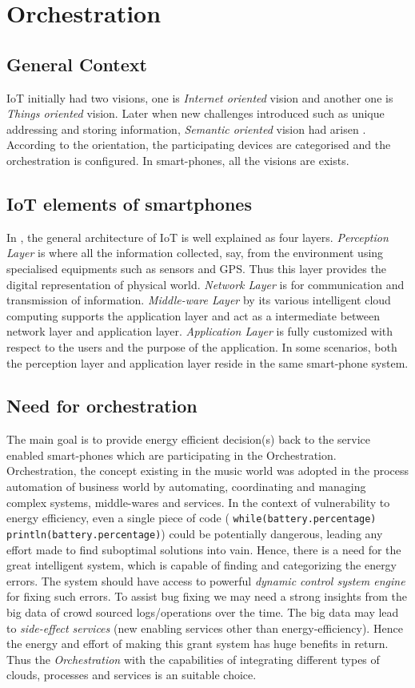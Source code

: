 \chapter{Orchestration}

\section{General Context}
IoT initially had two visions, one is \textit{Internet oriented} vision and another one is \textit{Things oriented} vision. Later when new challenges introduced such as unique addressing and storing information, \emph{Semantic oriented} vision had arisen \cite{IoT:Survey}. According to the orientation, the participating devices are categorised and the orchestration is configured. In smart-phones, all the visions are exists. 
\section{IoT elements of smartphones}
In \cite{IoT:Arch}, the general architecture of IoT is well explained as four layers. \emph{Perception Layer} is where all the information collected, say, from the environment using specialised equipments such as sensors and GPS. Thus this layer provides the digital representation of physical world. \emph{Network Layer} is for communication and transmission of information. \emph{Middle-ware Layer} by its various intelligent cloud computing supports the application layer and act as a intermediate between network layer and application layer. \emph{Application Layer} is fully customized with respect to the users and the purpose of the application. In some scenarios, both the perception layer and application layer reside in the same smart-phone system.
\section{Need for orchestration}
The main goal is to provide energy efficient decision(s) back to the service enabled smart-phones which are participating in the Orchestration. Orchestration, the concept existing in the music world was adopted in the process automation of business world by automating, coordinating and managing complex systems, middle-wares and services. In the context of vulnerability to energy efficiency, even a single piece of code  ( {\tt while(battery.percentage) println(battery.percentage)}) could be potentially dangerous, leading any effort made to find suboptimal solutions into vain. Hence, there is a need for the great intelligent system, which is capable of finding and categorizing the energy errors. The system should have access to powerful \textit{dynamic control system engine} for fixing such errors. To assist bug fixing we may need a strong insights from the big data of crowd sourced logs/operations  over the time. The big data may lead to \emph{side-effect services} (new enabling services other than energy-efficiency). Hence the energy and effort of making this grant system has huge benefits in return. Thus the \emph{Orchestration}  with the capabilities of integrating different types of clouds, processes and services is an suitable choice. 

